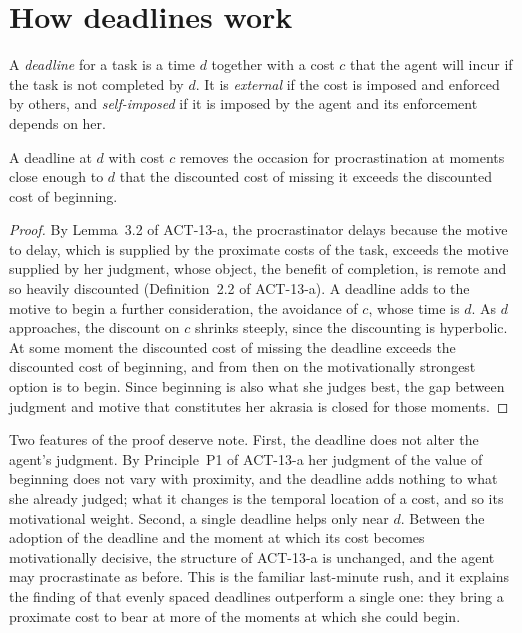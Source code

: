 \documentclass{situationist-preprint}
\begin{document}
\section{How deadlines work}

\begin{definition}[Deadline]\label{d:deadline}
A \emph{deadline} for a task is a time $d$ together with a cost $c$ that the agent will incur if the task is not completed by $d$. It is \emph{external} if the cost is imposed and enforced by others, and \emph{self-imposed} if it is imposed by the agent and its enforcement depends on her.
\end{definition}

\begin{proposition}\label{p:works}
A deadline at $d$ with cost $c$ removes the occasion for procrastination at moments close enough to $d$ that the discounted cost of missing it exceeds the discounted cost of beginning.
\end{proposition}

\begin{proof}
By Lemma~3.2 of ACT-13-a, the procrastinator delays because the motive to delay, which is supplied by the proximate costs of the task, exceeds the motive supplied by her judgment, whose object, the benefit of completion, is remote and so heavily discounted (Definition~2.2 of ACT-13-a). A deadline adds to the motive to begin a further consideration, the avoidance of $c$, whose time is $d$. As $d$ approaches, the discount on $c$ shrinks steeply, since the discounting is hyperbolic. At some moment the discounted cost of missing the deadline exceeds the discounted cost of beginning, and from then on the motivationally strongest option is to begin. Since beginning is also what she judges best, the gap between judgment and motive that constitutes her akrasia is closed for those moments.
\end{proof}

Two features of the proof deserve note. First, the deadline does not alter the agent's judgment. By Principle~P1 of ACT-13-a her judgment of the value of beginning does not vary with proximity, and the deadline adds nothing to what she already judged; what it changes is the temporal location of a cost, and so its motivational weight. Second, a single deadline helps only near $d$. Between the adoption of the deadline and the moment at which its cost becomes motivationally decisive, the structure of ACT-13-a is unchanged, and the agent may procrastinate as before. This is the familiar last-minute rush, and it explains the finding of \citet{Ariely2002} that evenly spaced deadlines outperform a single one: they bring a proximate cost to bear at more of the moments at which she could begin.
\end{document}
